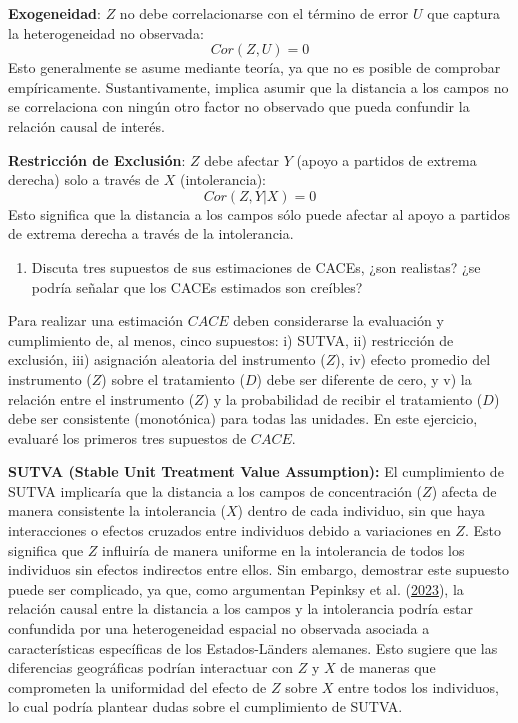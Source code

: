 \documentclass[
  12pt,
  a4paper,
]{article}
\providecommand{\tightlist}{%
  \setlength{\itemsep}{0pt}\setlength{\parskip}{0pt}}
\begin{document}
\textbf{Exogeneidad}: \(Z\) no debe correlacionarse con el término de error \(U\) que captura la heterogeneidad no observada: \[Cor(Z,U) = 0\] Esto generalmente se asume mediante teoría, ya que no es posible de comprobar empíricamente. Sustantivamente, implica asumir que la distancia a los campos no se correlaciona con ningún otro factor no observado que pueda confundir la relación causal de interés.

\textbf{Restricción de Exclusión}: \(Z\) debe afectar \(Y\) (apoyo a partidos de extrema derecha) solo a través de \(X\) (intolerancia): \[Cor(Z,Y|X) = 0\] Esto significa que la distancia a los campos sólo puede afectar al apoyo a partidos de extrema derecha a través de la intolerancia.

\begin{enumerate}
\def\labelenumi{\alph{enumi})}
\setcounter{enumi}{1}
\tightlist
\item
  Discuta tres supuestos de sus estimaciones de CACEs, ¿son realistas? ¿se podría señalar que los CACEs estimados son creíbles?
\end{enumerate}

Para realizar una estimación \(CACE\) deben considerarse la evaluación y cumplimiento de, al menos, cinco supuestos: i) SUTVA, ii) restricción de exclusión, iii) asignación aleatoria del instrumento (\(Z\)), iv) efecto promedio del instrumento (\(Z\)) sobre el tratamiento (\(D\)) debe ser diferente de cero, y v) la relación entre el instrumento (\(Z\)) y la probabilidad de recibir el tratamiento (\(D\)) debe ser consistente (monotónica) para todas las unidades. En este ejercicio, evaluaré los primeros tres supuestos de \(CACE\).

\textbf{SUTVA (Stable Unit Treatment Value Assumption):} El cumplimiento de SUTVA implicaría que la distancia a los campos de concentración (\(Z\)) afecta de manera consistente la intolerancia (\(X\)) dentro de cada individuo, sin que haya interacciones o efectos cruzados entre individuos debido a variaciones en \(Z\). Esto significa que \(Z\) influiría de manera uniforme en la intolerancia de todos los individuos sin efectos indirectos entre ellos. Sin embargo, demostrar este supuesto puede ser complicado, ya que, como argumentan Pepinksy et al. (\protect\hyperlink{ref-pepinsky_modeling_2023}{2023}), la relación causal entre la distancia a los campos y la intolerancia podría estar confundida por una heterogeneidad espacial no observada asociada a características específicas de los Estados-Länders alemanes. Esto sugiere que las diferencias geográficas podrían interactuar con \(Z\) y \(X\) de maneras que comprometen la uniformidad del efecto de \(Z\) sobre \(X\) entre todos los individuos, lo cual podría plantear dudas sobre el cumplimiento de SUTVA.
\end{document}
